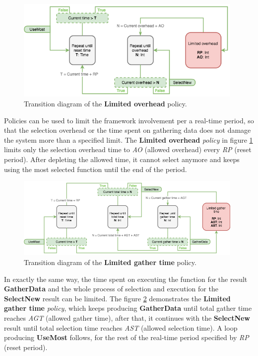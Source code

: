 \begin{figure}[h!]
	\captionsetup{justification=centering,margin=0.5cm}
	\centerline{\mbox{\includegraphics[width=110mm]{./img/limited_overhead.png}}}
	\caption{Transition diagram of the \textbf{Limited overhead} policy.}
	\label{fig:limited_overhead}
\end{figure}

Policies can be used to limit the framework involvement per a real-time period, so that the selection overhead or the time spent on gathering data does not damage the system more than a specified limit. The \textbf{Limited overhead} \textit{policy} in figure \ref{fig:limited_overhead} limits only the selection overhead time to \textit{AO} (allowed overhead) every \textit{RP} (reset period). After depleting the allowed time, it cannot select anymore and keeps using the most selected function until the end of the period.

\begin{figure}[h!]
	\captionsetup{justification=centering,margin=0.5cm}
	\centerline{\mbox{\includegraphics[width=110mm]{./img/limited_gather_time.png}}}
	\caption{Transition diagram of the \textbf{Limited gather time} policy.}
	\label{fig:limited_gather_time}
\end{figure}

In exactly the same way, the time spent on executing the function for the result \textbf{GatherData} and the whole process of selection and execution for the \textbf{SelectNew} result can be limited. The figure \ref{fig:limited_gather_time} demonstrates the \textbf{Limited gather time} \textit{policy}, which keeps producing \textbf{GatherData} until total gather time reaches \textit{AGT} (allowed gather time), after that, it continues with the \textbf{SelectNew} result until total selection time reaches \textit{AST} (allowed selection time). A loop producing \textbf{UseMost} follows, for the rest of the real-time period specified by \textit{RP} (reset period).

